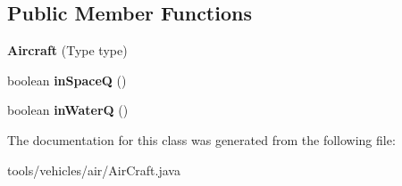 \subsection*{Public Member Functions}
\begin{DoxyCompactItemize}
\item 
{\bfseries Aircraft} (Type type)\hypertarget{classtools_1_1vehicles_1_1air_1_1_aircraft_a2e44ec45487e0510489147b75c86fff6}{}\label{classtools_1_1vehicles_1_1air_1_1_aircraft_a2e44ec45487e0510489147b75c86fff6}

\item 
boolean {\bfseries in\+SpaceQ} ()\hypertarget{classtools_1_1vehicles_1_1air_1_1_aircraft_a87552a93d7bff7846b29ce4d260be969}{}\label{classtools_1_1vehicles_1_1air_1_1_aircraft_a87552a93d7bff7846b29ce4d260be969}

\item 
boolean {\bfseries in\+WaterQ} ()\hypertarget{classtools_1_1vehicles_1_1air_1_1_aircraft_a46b97e2a63cea4f622167440f1951242}{}\label{classtools_1_1vehicles_1_1air_1_1_aircraft_a46b97e2a63cea4f622167440f1951242}

\end{DoxyCompactItemize}


The documentation for this class was generated from the following file\+:\begin{DoxyCompactItemize}
\item 
tools/vehicles/air/Air\+Craft.\+java\end{DoxyCompactItemize}
